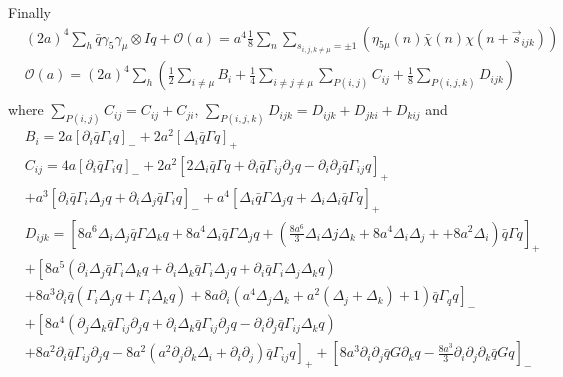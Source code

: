 Finally
\textcolor[rgb]{0,0,1}{
\begin{equation}
\begin{split}
&(2a)^4\sum _h \bar{q}\gamma _5\gamma _{\mu}\otimes I q + \mathcal{O}(a) = a^4 \frac{1}{8}\sum _n \sum _{s_{i,j,k\neq \mu }=\pm 1}\left(\eta _{5\mu}(n)\bar{\chi}(n)\chi(n+\vec{s}_{ijk})\right)\\
&\mathcal{O}(a) =(2a)^4\sum _h \left(\frac{1}{2}\sum _{i\neq \mu}B_i+\frac{1}{4}\sum _{i\neq j\neq \mu}\sum _{P(i,j)}C_{ij}+\frac{1}{8}\sum _{P(i,j,k)}D_{ijk}\right)\\
\end{split}
\end{equation} 
where $\sum _{P(i,j)}C_{ij}=C_{ij}+C_{ji}$, $\sum _{P(i,j,k)}D_{ijk}=D_{ijk}+D_{jki}+D_{kij}$ and
\begin{equation}
\begin{split}
&B_i=2a\left[\partial _i\bar{q}\Gamma _i q\right]_- +2a^2\left[\Delta _i \bar{q}\Gamma  q\right]_+\\
&C_{ij}=4a\left[\partial _i\bar{q}\Gamma _i q\right]_-+2a^2\left[2\Delta _i \bar{q}\Gamma  q +\partial _i \bar{q}\Gamma _{ij}\partial _j q -\partial _i\partial _j \bar{q}\Gamma _{ij}q\right]_+\\
&+a^3\left[\partial _i \bar{q}\Gamma _i \Delta _j q +\partial _i\Delta _j \bar{q}\Gamma _i q\right]_-+a^4\left[\Delta _i \bar{q}\Gamma\Delta _j q+\Delta _i\Delta _i \bar{q}\Gamma  q\right]_+\\
&D_{ijk}=\left[8a^6 \Delta _i\Delta _j \bar{q}\Gamma \Delta _k q +8a^4 \Delta _i \bar{q}\Gamma \Delta _j q +\left(\frac{8a^6}{3}\Delta _i\Delta j\Delta _k +8a^4\Delta _i\Delta _j + +8a^2 \Delta _i\right)\bar{q}\Gamma q\right]_+\\
&+\left[8a^5\left(\partial _i\Delta _j \bar{q}\Gamma _i \Delta _k q+ \partial _i \Delta _k \bar{q}\Gamma _i \Delta _j q + \partial _i \bar{q}\Gamma _i \Delta _j\Delta _k q\right)\right.\\
&\left. +8a^3\partial _i \bar{q}\left(\Gamma _i\Delta _j q+\Gamma _i \Delta _k q\right)+8a\partial _i \left(a^4\Delta _j\Delta _k + a^2(\Delta_j+\Delta _k)+1\right)\bar{q}\Gamma _q q\right]_-\\
&+\left[8a^4\left(\partial _j\Delta _k \bar{q}\Gamma _{ij}\partial _j q + \partial _i\Delta _k \bar{q}\Gamma _{ij}\partial _j q - \partial _i \partial _j \bar{q}\Gamma _{ij}\Delta _k q\right)\right.\\
&\left.+8a^2\partial _i\bar{q}\Gamma _{ij}\partial _j q - 8 a^2 \left(a^2\partial _j\partial _k\Delta _i + \partial _i\partial _j\right)\bar{q}\Gamma _{ij}q\right]_+ 
+\left[8a^3\partial _i\partial _j \bar{q} G \partial _k q - \frac{8a^3}{3}\partial _i\partial _j\partial _k \bar{q}G q\right]_-\\
\end{split}
\end{equation} 
}



